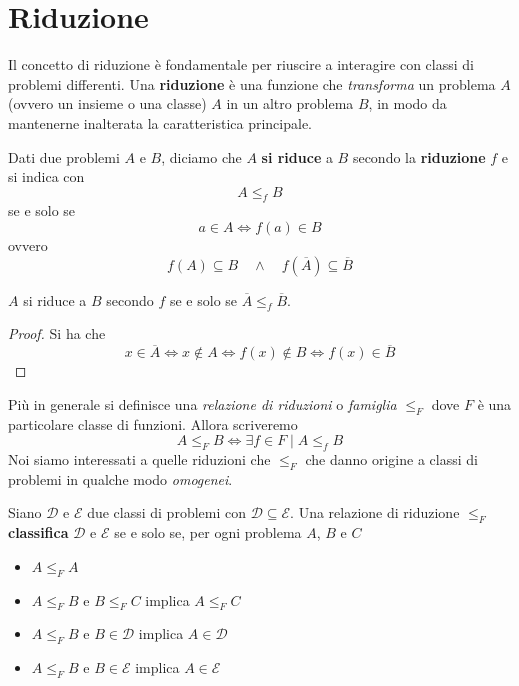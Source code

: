 \section{Riduzione}
Il concetto di riduzione è fondamentale per riuscire a interagire
con classi di problemi differenti. Una \textbf{riduzione} è una
funzione che \emph{transforma} un problema $A$ (ovvero un insieme
o una classe) $A$ in un altro problema $B$, in modo da mantenerne
inalterata la caratteristica principale.

\begin{definition} \label{def: riduzione}
	Dati due problemi $A$ e $B$, diciamo che $A$ \textbf{si riduce}
	a $B$ secondo la \textbf{riduzione} $f$ e si indica con
	\[ A \leq_f B \]
	se e solo se
	\[ a \in A \iff f(a) \in B \]
	ovvero
	\[
		f(A) \subseteq B \quad \land
		\quad f(\overline{A}) \subseteq \overline{B}
	\]
\end{definition}

\begin{property} \label{prop: riduzione_comp}
	$A$ si riduce a $B$ secondo $f$ se e solo se
	$\overline{A} \leq_f \overline{B}$.
	\begin{proof}
		Si ha che
		\[
			x \in \overline{A} \iff x \notin A \iff
			f(x) \notin B \iff f(x) \in \overline{B}
		\]
	\end{proof}
\end{property}

Più in generale si definisce una \emph{relazione di riduzioni}
o \emph{famiglia} $\leq_F$ dove $F$ è una particolare classe di
funzioni. Allora scriveremo
\[ A \leq_F B \iff \exists f \in F \mid A \leq_f B \]
Noi siamo interessati a quelle riduzioni che $\leq_F$ che danno
origine a classi di problemi in qualche modo \emph{omogenei}.

\begin{lemma} \label{def: classificazione}
	Siano $\mathcal{D}$ e $\mathcal{E}$ due classi di problemi
	con $\mathcal{D} \subseteq \mathcal{E}$. Una relazione di
	riduzione $\leq_F$ \textbf{classifica} $\mathcal{D}$ e
	$\mathcal{E}$ se e solo se, per ogni problema $A$, $B$ e $C$
	\begin{itemize}
		\item $A \leq_F A$
		\item $A \leq_F B$ e $B \leq_F C$ implica $A \leq_F C$
		\item $A \leq_F B$ e $B \in \mathcal{D}$ implica
		      $A \in \mathcal{D}$
		\item $A \leq_F B$ e $B \in \mathcal{E}$ implica
		      $A \in \mathcal{E}$
	\end{itemize}
\end{lemma}

